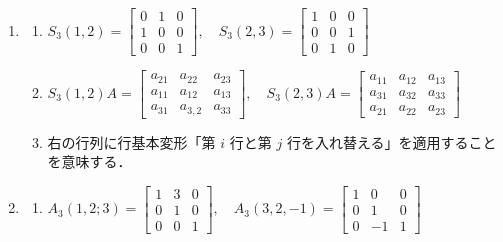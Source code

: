 \documentclass[11pt, uplatex, dvipdfmx]{jsarticle}
\begin{document}
\begin{enumerate}
\item
  \begin{enumerate}[(1)]
    \setlength{\itemsep}{1ex}
    
  \item $S_3(1,2)=\left[
      \begin{array}{rrr}
        0 & 1 & 0\\
        1 & 0 & 0\\
        0 & 0 & 1
      \end{array}
    \right], \quad S_3(2,3) = \left[
      \begin{array}{rrr}
        1 & 0 & 0\\
        0 & 0 & 1\\
        0 & 1 & 0
      \end{array}
      \right]$

  \item $S_3(1,2)A=\left[
      \begin{array}{rrr}
        a_{21} & a_{22} & a_{23}\\
        a_{11} & a_{12} & a_{13}\\
        a_{31} & a_{3,2} & a_{33}
      \end{array}
    \right], \quad S_3(2,3) A = \left[
      \begin{array}{rrr}
        a_{11} & a_{12} & a_{13}\\
        a_{31} & a_{32} & a_{33}\\
        a_{21} & a_{22} & a_{23}
      \end{array}
      \right]$

  \item 右の行列に行基本変形「第 $i$ 行と第 $j$ 行を入れ替える」を適用することを意味する．
  \end{enumerate}

\item
  \begin{enumerate}[(1)]
    \setlength{\itemsep}{1ex}
    
  \item $A_3(1,2;3)=\left[
      \begin{array}{rrr}
        1 & 3 & 0\\
        0 & 1 & 0\\
        0 & 0 & 1
      \end{array}
    \right], \quad A_3(3,2,-1)=\left[
      \begin{array}{rrr}
        1 & 0 & 0\\
        0 & 1 & 0\\
        0 & -1 & 1
      \end{array}
    \right]$
    

\end{enumerate}
\end{enumerate}
\end{document}
